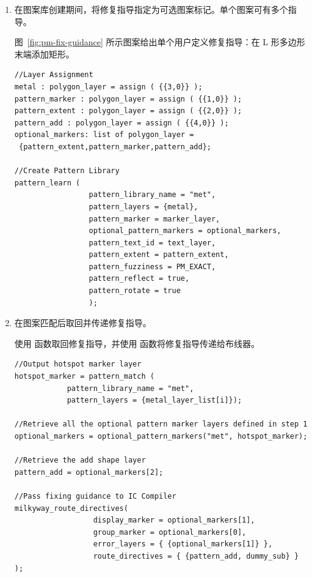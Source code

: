 \begin{enumerate}
  \item 在图案库创建期间，将修复指导指定为可选图案标记。单个图案可有多个指导。

  图~\ref{fig:pm-fix-guidance} 所示图案给出单个用户定义修复指导：在 L 形多边形末端添加矩形。


\begin{lstlisting}[style=pxl,caption={在图案库创建时附着修复指导},label={ex:pm-attach-fix}]
//Layer Assignment
metal : polygon_layer = assign ( {{3,0}} );
pattern_marker : polygon_layer = assign ( {{1,0}} );
pattern_extent : polygon_layer = assign ( {{2,0}} );
pattern_add : polygon_layer = assign ( {{4,0}} );
optional_markers: list of polygon_layer =
 {pattern_extent,pattern_marker,pattern_add};

//Create Pattern Library
pattern_learn (
                 pattern_library_name = "met",
                 pattern_layers = {metal},
                 pattern_marker = marker_layer,
                 optional_pattern_markers = optional_markers,
                 pattern_text_id = text_layer,
                 pattern_extent = pattern_extent,
                 pattern_fuzziness = PM_EXACT,
                 pattern_reflect = true,
                 pattern_rotate = true
                 );
\end{lstlisting}

  \item 在图案匹配后取回并传递修复指导。

  使用  函数取回修复指导，并使用  函数将修复指导传递给布线器。

\begin{lstlisting}[style=pxl,caption={取回并传递修复指导},label={ex:pm-pass-fix}]
//Output hotspot marker layer
hotspot_marker = pattern_match (
            pattern_library_name = "met",
            pattern_layers = {metal_layer_list[i]});

//Retrieve all the optional pattern marker layers defined in step 1
optional_markers = optional_pattern_markers("met", hotspot_marker);

//Retrieve the add shape layer
pattern_add = optional_markers[2];

//Pass fixing guidance to IC Compiler
milkyway_route_directives(
                  display_marker = optional_markers[1],
                  group_marker = optional_markers[0],
                  error_layers = { {optional_markers[1]} },
                  route_directives = { {pattern_add, dummy_sub} } );
\end{lstlisting}


\end{enumerate}
